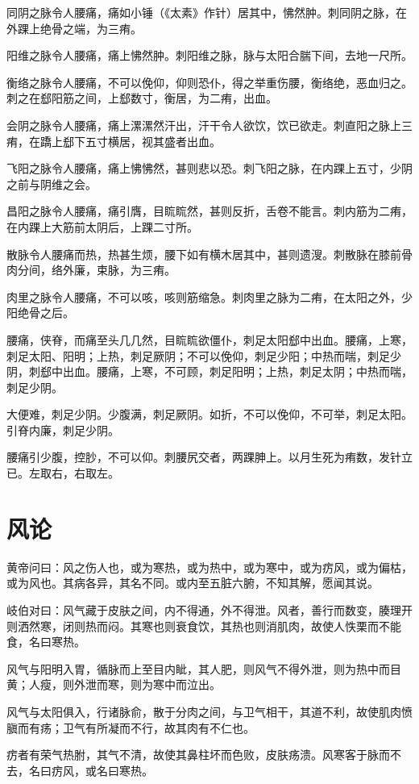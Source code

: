 \documentclass{article}%
\begin{document}
同阴之脉令人腰痛，痛如小锤（《太素》作针）居其中，怫然肿。刺同阴之脉，在外踝上绝骨之端，为三痏。

阳维之脉令人腰痛，痛上怫然肿。刺阳维之脉，脉与太阳合腨下间，去地一尺所。

衡络之脉令人腰痛，不可以俛仰，仰则恐仆，得之举重伤腰，衡络绝，恶血归之。刺之在郄阳筋之间，上郄数寸，衡居，为二痏，出血。

会阴之脉令人腰痛，痛上漯漯然汗出，汗干令人欲饮，饮已欲走。刺直阳之脉上三痏，在蹻上郄下五寸横居，视其盛者出血。

飞阳之脉令人腰痛，痛上怫怫然，甚则悲以恐。刺飞阳之脉，在内踝上五寸，少阴之前与阴维之会。

昌阳之脉令人腰痛，痛引膺，目䀮䀮然，甚则反折，舌卷不能言。刺内筋为二痏，在内踝上大筋前太阴后，上踝二寸所。

散脉令人腰痛而热，热甚生烦，腰下如有横木居其中，甚则遗溲。刺散脉在膝前骨肉分间，络外廉，束脉，为三痏。

肉里之脉令人腰痛，不可以咳，咳则筋缩急。刺肉里之脉为二痏，在太阳之外，少阳绝骨之后。

腰痛，侠脊，而痛至头几几然，目䀮䀮欲僵仆，刺足太阳郄中出血。腰痛，上寒，刺足太阳、阳明；上热，刺足厥阴；不可以俛仰，刺足少阳；中热而喘，刺足少阴，刺郄中出血。腰痛，上寒，不可顾，刺足阳明；上热，刺足太阴；中热而喘，刺足少阴。

大便难，刺足少阴。少腹满，刺足厥阴。如折，不可以俛仰，不可举，刺足太阳。引脊内廉，刺足少阴。

腰痛引少腹，控䏚，不可以仰。刺腰尻交者，两踝胂上。以月生死为痏数，发针立已。左取右，右取左。
\section{风论}
黄帝问曰：风之伤人也，或为寒热，或为热中，或为寒中，或为疠风，或为偏枯，或为风也。其病各异，其名不同。或内至五脏六腑，不知其解，愿闻其说。

岐伯对曰：风气藏于皮肤之间，内不得通，外不得泄。风者，善行而数变，腠理开则洒然寒，闭则热而闷。其寒也则衰食饮，其热也则消肌肉，故使人怢栗而不能食，名曰寒热。

风气与阳明入胃，循脉而上至目内眦，其人肥，则风气不得外泄，则为热中而目黄；人瘦，则外泄而寒，则为寒中而泣出。

风气与太阳俱入，行诸脉俞，散于分肉之间，与卫气相干，其道不利，故使肌肉愤䐜而有疡；卫气有所凝而不行，故其肉有不仁也。

疠者有荣气热胕，其气不清，故使其鼻柱坏而色败，皮肤疡溃。风寒客于脉而不去，名曰疠风，或名曰寒热。
\end{document}
